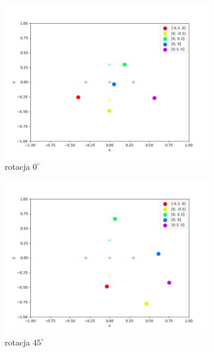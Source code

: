 \begin{figure}[h]
\centering
\begin{subfigure}{.5\textwidth}
    \centering
    \includegraphics[width=\linewidth]{pics/mult_lat_2d_angle/positions_0_mean.png}
\caption{rotacja $0^{\circ}$}
\label{pic:2d_0_angle_mult}
\end{subfigure}%
\begin{subfigure}{.5\textwidth}
    \centering
    \includegraphics[width=\linewidth]{pics/mult_lat_2d_angle/positions_45_mean.png}
\caption{rotacja $45^{\circ}$}
\label{pic:2d_45_angle_mult}
\end{subfigure}
\begin{subfigure}{.5\textwidth}
    \centering

\end{subfigure}
\end{figure}
